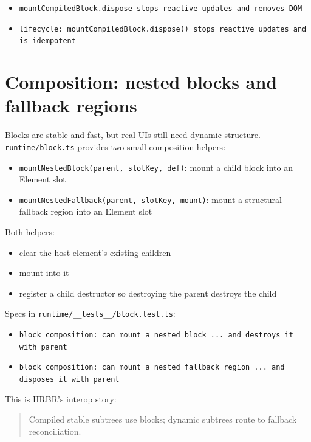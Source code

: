 \begin{itemize}
  \item \texttt{mountCompiledBlock.dispose stops reactive updates and removes DOM}
  \item \texttt{lifecycle: mountCompiledBlock.dispose() stops reactive updates and is idempotent}
\end{itemize}

\section{Composition: nested blocks and fallback regions}

Blocks are stable and fast, but real UIs still need dynamic structure.
\texttt{runtime/block.ts} provides two small composition helpers:

\begin{itemize}
  \item \texttt{mountNestedBlock(parent, slotKey, def)}: mount a child block into an Element slot
  \item \texttt{mountNestedFallback(parent, slotKey, mount)}: mount a structural fallback region into an Element slot
\end{itemize}

Both helpers:

\begin{itemize}
  \item clear the host element’s existing children
  \item mount into it
  \item register a child destructor so destroying the parent destroys the child
\end{itemize}

Specs in \texttt{runtime/\_\_tests\_\_/block.test.ts}:

\begin{itemize}
  \item \texttt{block composition: can mount a nested block ... and destroys it with parent}
  \item \texttt{block composition: can mount a nested fallback region ... and disposes it with parent}
\end{itemize}

This is HRBR's interop story:

\begin{quote}
Compiled stable subtrees use blocks; dynamic subtrees route to fallback reconciliation.
\end{quote}

